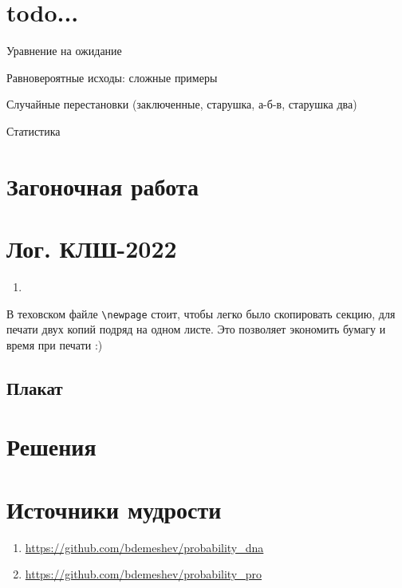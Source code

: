 \documentclass[12pt]{article}
\newcounter{problem}[section]
\theoremstyle{definition}
\begin{document}
\section{todo...}

Уравнение на ожидание



Равновероятные исходы: сложные примеры

Случайные перестановки (заключенные, старушка, а-б-в, старушка два)

Статистика




\section{Загоночная работа}





\newpage

\section{Лог. КЛШ-2022}

\begin{enumerate}
  \item 
\end{enumerate}

В теховском файле \verb|\newpage| стоит, чтобы легко было скопировать секцию, для печати двух копий подряд на одном листе.
Это позволяет экономить бумагу и время при печати :)

\subsection{Плакат}






\renewenvironment{solution}[1]{%
         \vskip .5cm plus 2cm minus 0.1cm%
         {\bfseries \hyperlink{problem:#1}{#1.}}%
}%
{%
}%



\section{Решения}



\section{Источники мудрости}


\begin{enumerate}
\item \url{https://github.com/bdemeshev/probability_dna}
\item \url{https://github.com/bdemeshev/probability_pro}
\end{enumerate}

\printbibliography[heading=none]
\end{document}
